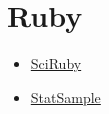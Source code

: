 \chapter{Ruby}


\begin{itemize}
\item \href{http://sciruby.com/}{SciRuby}
\item \href{http://ruby-statsample.rubyforge.org/}{StatSample}
\end{itemize}

